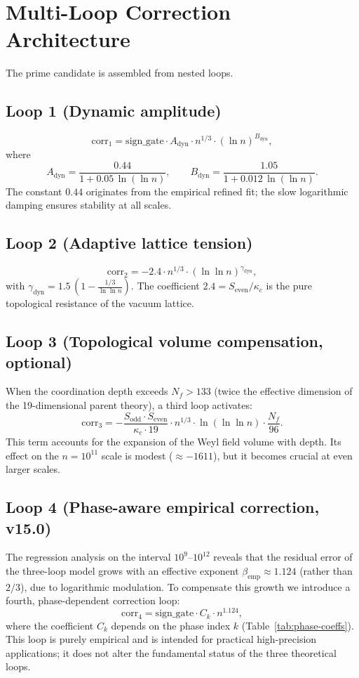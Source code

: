 \documentclass[12pt,a4paper]{article}
\newcommand{\kappac}{\kappa_c}
\newcommand{\Sodd}{S_{\mathrm{odd}}}
\newcommand{\Seven}{S_{\mathrm{even}}}
\begin{document}
	\section{Multi-Loop Correction Architecture}
	\label{sec:multiloop}
	The prime candidate is assembled from nested loops.
	
	\subsection{Loop 1 (Dynamic amplitude)}
	\[
	\mathrm{corr}_1 = \mathrm{sign\_gate} \cdot A_{\mathrm{dyn}} \cdot n^{1/3} \cdot (\ln n)^{B_{\mathrm{dyn}}},
	\]
	where
	\[
	A_{\mathrm{dyn}} = \frac{0.44}{1 + 0.05\,\ln(\ln n)}, \qquad
	B_{\mathrm{dyn}} = \frac{1.05}{1 + 0.012\,\ln(\ln n)}.
	\]
	The constant \(0.44\) originates from the empirical refined fit; the slow logarithmic damping ensures stability at all scales.
	
	\subsection{Loop 2 (Adaptive lattice tension)}
	\[
	\mathrm{corr}_2 = -2.4 \cdot n^{1/3} \cdot (\ln\ln n)^{\gamma_{\mathrm{dyn}}},
	\]
	with \(\gamma_{\mathrm{dyn}} = 1.5\,(1 - \frac{1/3}{\ln\ln n})\). The coefficient \(2.4 = \Seven/\kappac\) is the pure topological resistance of the vacuum lattice.
	
	\subsection{Loop 3 (Topological volume compensation, optional)}
	When the coordination depth exceeds \(N_f > 133\) (twice the effective dimension of the 19-dimensional parent theory), a third loop activates:
	\[
	\mathrm{corr}_3 = -\frac{\Sodd\cdot\Seven}{\kappac\cdot 19} \cdot n^{1/3} \cdot \ln(\ln\ln n) \cdot \frac{N_f}{96}.
	\]
	This term accounts for the expansion of the Weyl field volume with depth. Its effect on the \(n=10^{11}\) scale is modest (\(\approx -1611\)), but it becomes crucial at even larger scales.
	
	\subsection{Loop 4 (Phase-aware empirical correction, v15.0)}
	The regression analysis on the interval \(10^9\)--\(10^{12}\) reveals that the residual error of the three-loop model grows with an effective exponent \(\beta_{\mathrm{emp}} \approx 1.124\) (rather than \(2/3\)), due to logarithmic modulation.  To compensate this growth we introduce a fourth, phase-dependent correction loop:
	\[
	\mathrm{corr}_4 = \mathrm{sign\_gate} \cdot C_k \cdot n^{1.124},
	\]
	where the coefficient \(C_k\) depends on the phase index \(k\) (Table~\ref{tab:phase-coeffs}).  This loop is purely empirical and is intended for practical high-precision applications; it does not alter the fundamental status of the three theoretical loops.
	
\end{document}
